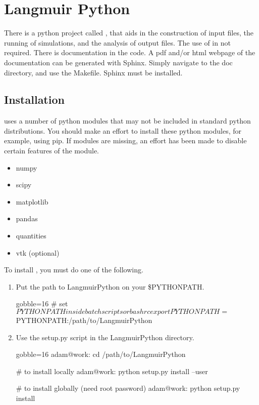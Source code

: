 \newpage
\section{Langmuir Python}
\label{sec:python}
There is a python project called \LangmuirPython, that aids in the
    construction of input files, the running
    of simulations, and the analysis of output files.
The use of \LangmuirPython in not required.
There is documentation in the code.
A pdf and/or html webpage of the documentation can be generated with Sphinx.
Simply navigate to the \LangmuirPython doc directory, and use the Makefile.
Sphinx must be installed.

\subsection{Installation}
    \LangmuirPython uses a number of python modules that may not be
        included in standard python distributions.
    You should make an effort to install these python modules, for
        example, using pip.
    If modules are missing, an effort has been made to disable certain
        features of the \langmuir module.
    \begin{itemize}
        \item numpy
        \item scipy
        \item matplotlib
        \item pandas
        \item quantities
        \item vtk (optional)
    \end{itemize}

    To install \LangmuirPython, you must do one of the following.
    \begin{enumerate}
        \item Put the path to LangmuirPython on your \$PYTHONPATH.
            \begin{bashcode*}{gobble=16}
                # set $PYTHONPATH inside batch scripts or bashrc
                export PYTHONPATH=$PYTHONPATH:/path/to/LangmuirPython
            \end{bashcode*}
        \item Use the setup.py script in the LangmuirPython directory.
            \begin{bashcode*}{gobble=16}
                adam@work: cd /path/to/LangmuirPython

                # to install locally
                adam@work: python setup.py install --user

                # to install globally (need root password)
                adam@work: python setup.py install
            \end{bashcode*}
    \end{enumerate}

